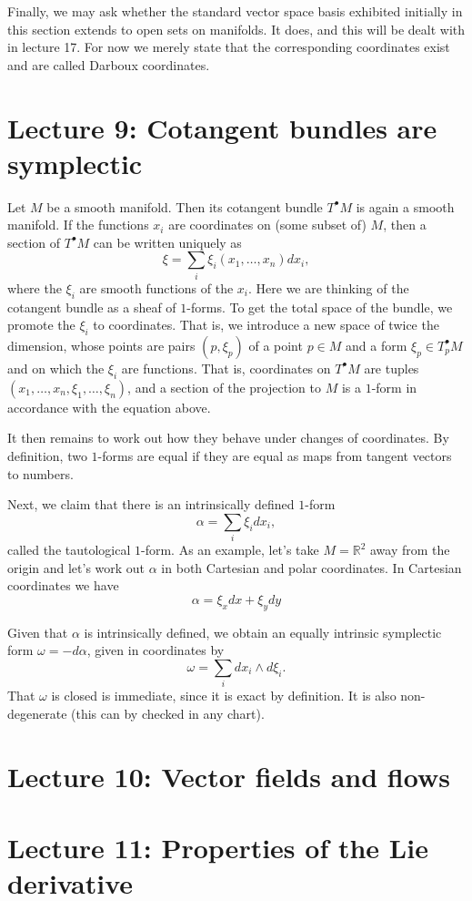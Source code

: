 \documentclass[11pt]{article} %
\begin{document}
Finally, we may ask whether the standard vector space basis exhibited initially in this section extends to open sets on manifolds. It does, and this will be dealt with in lecture 17. For now we merely state that the corresponding coordinates exist and are called Darboux coordinates.


\section*{Lecture 9: Cotangent bundles are symplectic}
Let $M$ be a smooth manifold. Then its cotangent bundle $T^\bullet M$ is again a smooth manifold. If the functions $x_i$ are coordinates on (some subset of) $M$, then a section of $T^\bullet M$ can be written uniquely as
$$
\xi = \sum_i \xi_i(x_1, \dots, x_n) dx_i,
$$
where the $\xi_i$ are smooth functions of the $x_i$. Here we are thinking of the cotangent bundle as a sheaf of $1$-forms. To get the total space of the bundle, we promote the $\xi_i$ to coordinates. That is, we introduce a new space of twice the dimension, whose points are pairs $(p, \xi_p)$ of a point $p\in M$ and a form $\xi_p \in T^\bullet_p M$ and on which the $\xi_i$ are functions. That is, coordinates on $T^\bullet M$ are tuples $(x_1, \dots, x_n, \xi_1, \dots, \xi_n)$, and a section of the projection to $M$ is a $1$-form in accordance with the equation above. 

It then remains to work out how they behave under changes of coordinates. By definition, two $1$-forms are equal if they are equal as maps from tangent vectors to numbers. 


Next, we claim that there is an intrinsically defined $1$-form
$$
\alpha = \sum_i \xi_i dx_i,
$$
called the tautological $1$-form. As an example, let's take $M=\mathbb{R}^2$ away from the origin and let's work out $\alpha$ in both Cartesian and polar coordinates. In Cartesian coordinates we have
$$
\alpha = \xi_x dx + \xi_y dy
$$

Given that $\alpha$ is intrinsically defined, we obtain an equally intrinsic symplectic form $\omega = -d\alpha$, given in coordinates by
$$
\omega = \sum_i dx_i \wedge d\xi_i.
$$
That $\omega$ is closed is immediate, since it is exact by definition. It is also non-degenerate (this can by checked in any chart).
\section*{Lecture 10: Vector fields and flows}

\section*{Lecture 11: Properties of the Lie derivative}
\end{document}

